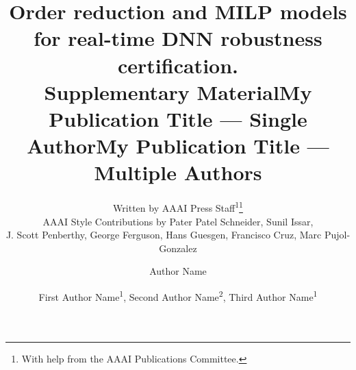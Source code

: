 \documentclass[letterpaper]{article} %
\title{Order reduction and MILP models for real-time DNN robustness certification. \\ Supplementary Material}
\date{}
\author{
	Written by AAAI Press Staff\textsuperscript{\rm 1}\thanks{With help from the AAAI Publications Committee.}\\
	AAAI Style Contributions by Pater Patel Schneider,
	Sunil Issar,\\
	J. Scott Penberthy,
	George Ferguson,
	Hans Guesgen,
	Francisco Cruz\equalcontrib,
	Marc Pujol-Gonzalez\equalcontrib
}
\title{My Publication Title --- Single Author}
\author {
	Author Name
}
\title{My Publication Title --- Multiple Authors}
\author {
	First Author Name\textsuperscript{\rm 1},
	Second Author Name\textsuperscript{\rm 2},
	Third Author Name\textsuperscript{\rm 1}
}
\begin{document}
	
	\maketitle
	
	\iffalse
	\begin{abstract}
		
		
		Most DNNs are brittle to small perturbations. Extensive works have thus been performed to verify robustness for DNNs.
		However, these works mostly consider local robustness, i.e. in the neighborhood of an image.
		While local robustness is useful to have an idea how often non robust images happen, by repeating the verification on 1000 or 10000 pre-obtained images, the main shortcoming is that we have no guarantee that a specific new incoming image, e.g. in a video feed, is robust: The verification process takes too long and requires too much resources to be performed online on embedded systems.
		
		In this paper, we consider {\em global} robustness, that is, guarantees not restricted to a set of local images. For that, we consider {\em bounds} on the switch of values between the different decision classes of a DNN due to a given perturbation. 
		The verification question is much harder than local robustness, as the number of complex variables doubles (from the deviation image to the image and its deviation).
		Further, the values each neuron can take is no more in a small neighborhood.
		Therefore, the global verification process is very complex.
		To obtain useable bounds, we develop several novel partial MILP models for global robustness, with different trade-offs. Last, we use order reduction techniques to reduce the space of images considered, avoiding unrealistic inputs, by using linear PCA. 
		This results into usable bounds, allowing in real time to certify robustness for $87\%$ of incoming images in the MNIST benchmark for a L1-perturbation of $0.5$, as well as for a surrogate computing the hidden plastic strain associated to a deformation map of a pipe.
	\end{abstract}
	\fi
	
	

	
	
	
	
	
	
	 
	
	
	
	
\end{document}
